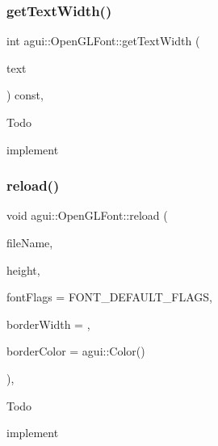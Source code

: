 \mbox{\label{classagui_1_1_open_g_l_font_a5cee06ae51d416cfb2997aa1ac7177ac}} 
\subsubsection{\texorpdfstring{get\+Text\+Width()}{getTextWidth()}}
{\footnotesize\ttfamily int agui\+::\+Open\+G\+L\+Font\+::get\+Text\+Width (\begin{DoxyParamCaption}\item[{const std\+::string \&}]{text }\end{DoxyParamCaption}) const\hspace{0.3cm}{\ttfamily [override]}, {\ttfamily [virtual]}}

\begin{DoxyRefDesc}{Todo}
\item[\mbox{\hyperlink{todo__todo000003}{Todo}}]implement \end{DoxyRefDesc}
\mbox{\label{classagui_1_1_open_g_l_font_a6361880d5d7cf07935d548b77c2d354b}} 
\subsubsection{\texorpdfstring{reload()}{reload()}}
{\footnotesize\ttfamily void agui\+::\+Open\+G\+L\+Font\+::reload (\begin{DoxyParamCaption}\item[{const std\+::string \&}]{file\+Name,  }\item[{int}]{height,  }\item[{Font\+Flags}]{font\+Flags = {\ttfamily FONT\+\_\+DEFAULT\+\_\+FLAGS},  }\item[{float}]{border\+Width = {},  }\item[{agui\+::\+Color}]{border\+Color = {\ttfamily agui\+:\+:Color()} }\end{DoxyParamCaption})\hspace{0.3cm}{\ttfamily [override]}, {\ttfamily [virtual]}}

\begin{DoxyRefDesc}{Todo}
\item[\mbox{\hyperlink{todo__todo000004}{Todo}}]implement \end{DoxyRefDesc}
\mbox{\label{classagui_1_1_open_g_l_font_a0b8b5c5bd6a8cda3767a3215c48a2e01}} 
